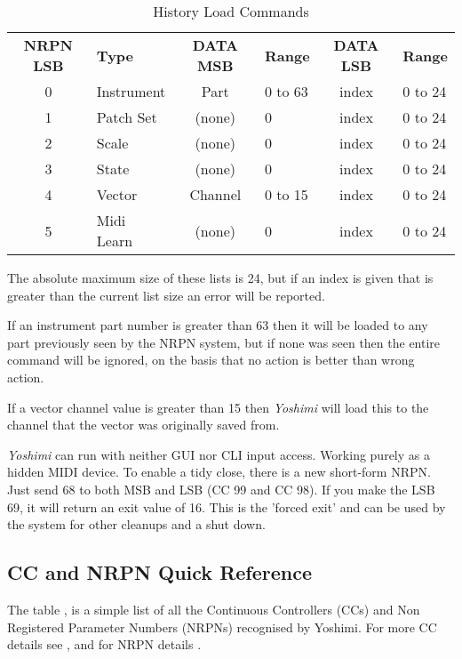    \begin{table}[H]
      \centering
      \caption{History Load Commands}
      \label{table:history_load_commands}
      \begin{tabular}{c l c l c l}
\textbf{NRPN LSB} & \textbf{Type} & \textbf{DATA MSB} & \textbf{Range} & \textbf{DATA LSB}  & \textbf{Range}\\
        0 & Instrument & Part    & 0 to 63 & index   & 0 to 24 \\
        1 & Patch Set  & (none)  & 0       & index   & 0 to 24 \\
        2 & Scale      & (none)  & 0       & index   & 0 to 24 \\
        3 & State      & (none)  & 0       & index   & 0 to 24 \\
        4 & Vector     & Channel & 0 to 15 & index   & 0 to 24 \\
        5 & Midi Learn & (none)  & 0       & index   & 0 to 24 \\
      \end{tabular}
   \end{table}

   The absolute maximum size of these lists is 24, but if an index is given that
   is greater than the current list size an error will be reported.

   If an instrument part number is greater than 63 then it will be loaded to any
   part previously seen by the NRPN system, but if none was seen then the entire
   command will be ignored, on the basis that no action is better than wrong action.

   If a vector channel value is greater than 15 then \textsl{Yoshimi} will load this
   to the channel that the vector was originally saved from.


   \textsl{Yoshimi} can run with neither GUI nor CLI input access. Working purely as
   a hidden MIDI device. To enable a tidy close, there is a new short-form NRPN.
   Just send 68 to both MSB and LSB (CC 99 and CC 98). If you make the LSB 69, it
   will return an exit value of 16. This is the 'forced exit' and can be used by the
   system for other cleanups and a shut down.
\iffalse
\subsection{CC and NRPN Quick Reference}
\label{subsection:cc_nrpn_quick_ref}
   The table , is a simple list of all the
   Continuous Controllers (CCs) and Non Registered Parameter Numbers (NRPNs)
   recognised by Yoshimi.
   For more CC details see , and for NRPN details .


